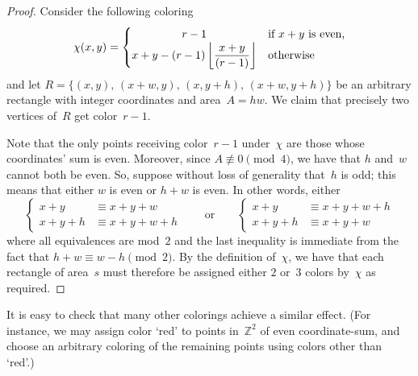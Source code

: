 \documentclass[a4paper, 11pt,reqno]{amsart}
\theoremstyle{definition}
\newcommand{\Z}{\mbox{${\mathbb Z}$}}
\begin{document}
\begin{proof}
  Consider the following coloring
  \[
    \chi(x,y) =
    \begin{cases}
      \hfil r-1            & \text{if $x + y$ is even,} \\
      \displaystyle x+y - (r-1)\left\lfloor\frac{x+y}{(r-1)}\right\rfloor   & \text{otherwise}
    \end{cases}
  \]
  and let $R=\{(x,y),\,(x+w,y),\,(x,y+h),\,(x+w,y+h)\}$ be an arbitrary
  rectangle with integer coordinates and area~$A=hw$.
  We claim that precisely two vertices of~$R$ get color~$r-1$.

  Note that the only points receiving color~$r-1$ under~$\chi$ are those whose coordinates' sum is even.
  Moreover, since $A\not\equiv 0\pmod 4$, we have that $h$ and~$w$ cannot both be even.
  So, suppose without loss of generality that~$h$ is odd; this means that either
  $w$ is even or $h+w$ is even. In other words, either
  \[
    \begin{cases}
      x+y   & \equiv x+y+w   \\
      x+y+h & \equiv x+y+w+h
    \end{cases}
    \qquad\text{or}\qquad
    \begin{cases}
      x+y   & \equiv x+y+w+h \\
      x+y+h & \equiv x+y+w
    \end{cases}
  \]
  where all equivalences are mod~$2$ and
  the last inequality is immediate from the fact that $h+w\equiv w-h \pmod 2$. By the definition of~$\chi$, we
  have that each rectangle of area~$s$ must therefore be assigned either $2$ or~$3$ colors by~$\chi$ as required.
\end{proof}

It is easy to check that many other colorings achieve a similar effect.
(For instance, we may assign color `red' to points in~$\Z^2$ of even coordinate-sum,
and choose an arbitrary coloring of the remaining points using colors
other than `red'.)
\end{document}
